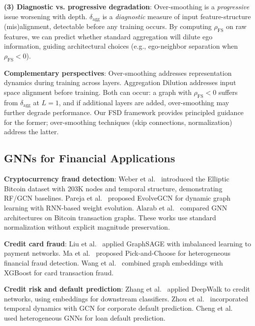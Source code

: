 \textbf{(3) Diagnostic vs. progressive degradation}: Over-smoothing is a \textit{progressive} issue worsening with depth. $\delta_{\text{agg}}$ is a \textit{diagnostic} measure of input feature-structure (mis)alignment, detectable before any training occurs. By computing $\rho_{\text{FS}}$ on raw features, we can predict whether standard aggregation will dilute ego information, guiding architectural choices (e.g., ego-neighbor separation when $\rho_{\text{FS}} < 0$).

\textbf{Complementary perspectives}: Over-smoothing addresses representation dynamics during training across layers. Aggregation Dilution addresses input space alignment before training. Both can occur: a graph with $\rho_{\text{FS}} < 0$ suffers from $\delta_{\text{agg}}$ at $L=1$, and if additional layers are added, over-smoothing may further degrade performance. Our FSD framework provides principled guidance for the former; over-smoothing techniques (skip connections, normalization) address the latter.

\subsection{GNNs for Financial Applications}

\textbf{Cryptocurrency fraud detection}: Weber et al.~\cite{weber2019anti} introduced the Elliptic Bitcoin dataset with 203K nodes and temporal structure, demonstrating RF/GCN baselines. Pareja et al.~\cite{pareja2020evolvegcn} proposed EvolveGCN for dynamic graph learning with RNN-based weight evolution. Alarab et al.~\cite{alarab2020bitcoin_gnn} compared GNN architectures on Bitcoin transaction graphs. These works use standard normalization without explicit magnitude preservation.

\textbf{Credit card fraud}: Liu et al.~\cite{liu2021gat_fraud} applied GraphSAGE with imbalanced learning to payment networks. Ma et al.~\cite{ma2021pickandchoose} proposed Pick-and-Choose for heterogeneous financial fraud detection. Wang et al.~\cite{wang2021credit_gnn} combined graph embeddings with XGBoost for card transaction fraud.

\textbf{Credit risk and default prediction}: Zhang et al.~\cite{zhang2020credit_embedding} applied DeepWalk to credit networks, using embeddings for downstream classifiers. Zhou et al.~\cite{zhou2022temporal_credit} incorporated temporal dynamics with GCN for corporate default prediction. Cheng et al.~\cite{cheng2020credit_heterogeneous} used heterogeneous GNNs for loan default prediction.

